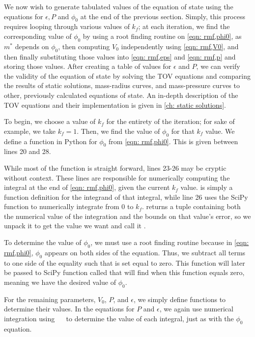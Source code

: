 We now wish to generate tabulated values of the equation of state using the equations for $\epsilon, P$ and $\phi_0$ at the end of the previous section. Simply, this process requires looping through various values of $k_f$; at each iteration, we find the corresponding value of $\phi_0$ by using a root finding routine on \eqref{eqn: rmf,phi0}, as $m^*$ depends on $\phi_0$, then computing $V_0$ independently using \eqref{eqn: rmf,V0}, and then finally substituting those values into \eqref{eqn: rmf,eps} and \eqref{eqn: rmf,p} and storing those values. After creating a table of values for $\epsilon$ and $P$, we can verify the validity of the equation of state by solving the TOV equations and comparing the results of static solutions, mass-radius curves, and mass-pressure curves to other, previously calculated equations of state. An in-depth description of the TOV equations and their implementation is given in \autoref{ch: static solutions}.

To begin, we choose a value of $k_f$ for the entirety of the iteration; for sake of example, we take $k_f = 1$. Then, we find the value of $\phi_0$ for that $k_f$ value. We define a function in Python for $\phi_0$ from \eqref{eqn: rmf,phi0}. This is given between lines 20 and 28.

While most of the function is straight forward, lines 23-26 may be cryptic without context. These lines are responsible for numerically computing the integral at the end of \eqref{eqn: rmf,phi0}, given the current $k_f$ value.  is simply a function definition for the integrand of that integral, while line 26 uses the SciPy function  to numerically integrate  from $0$ to $k_f$.  returns a tuple containing both the numerical value of the integration and the bounds on that value's error, so we unpack it to get the value we want and call it . 

To determine the value of $\phi_0$, we must use a root finding routine because in \eqref{eqn: rmf,phi0}, $\phi_0$ appears on both sides of the equation. Thus, we subtract all terms to one side of the equality such that is set equal to zero. This function will later be passed to SciPy function called  that will find when this function equals zero, meaning we have the desired value of $\phi_0$.

For the remaining parameters, $V_0$, $P$, and $\epsilon$, we simply define functions to determine their values. In the equations for $P$ and $\epsilon$, we again use numerical integration using $\quad$ to determine the value of each integral, just as with the $\phi_0$ equation.

